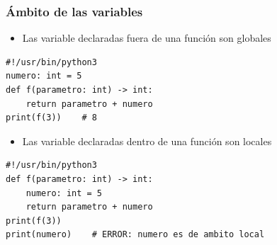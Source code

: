 \begin{frame}[fragile]
\frametitle{Ámbito de las variables}
\begin{itemize}
\item 
Las variable declaradas fuera de una función son globales
\end{itemize}
  \begin{footnotesize}
\begin{verbatim}
#!/usr/bin/python3
numero: int = 5
def f(parametro: int) -> int:
    return parametro + numero
print(f(3))    # 8
\end{verbatim}
  \end{footnotesize}

\begin{itemize}
\item 
Las variable declaradas dentro de una función son locales
\end{itemize}

  \begin{footnotesize}
\begin{verbatim}
#!/usr/bin/python3
def f(parametro: int) -> int:
    numero: int = 5
    return parametro + numero
print(f(3))
print(numero)    # ERROR: numero es de ambito local
\end{verbatim}
  \end{footnotesize}


\end{frame}


